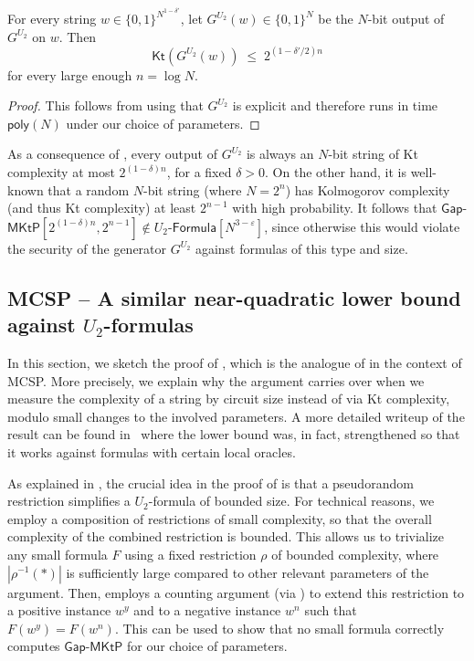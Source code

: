 \documentclass{toc}
\newcommand{\gapmktp}{\mathsf{Gap}$-$\mathsf{MKtP}}
\newcommand{\Kt}{\mathsf{Kt}}
\begin{document}
\begin{proposition}\label{prop:PRG_Kt}
For every string $w \in \{0,1\}^{N^{1 - \delta'}}$, let $G^{U_2}(w) \in \{0,1\}^N$ be the $N$-bit output of $G^{U_2}$ on $w$. Then
$$
\Kt(G^{U_2}(w)) \;\leq\; 2^{(1 - \delta'/2)n}
$$ 
for every large enough $n = \log N$.
\end{proposition}

\begin{proof}
This follows from  using that $G^{U_2}$ is explicit and therefore runs in time $\mathsf{poly}(N)$ under our choice of parameters.
\end{proof}

As a consequence of , every output of $G^{U_2}$ is always an $N$-bit string of Kt complexity at most $2^{(1 - \delta)n}$, for a fixed $\delta > 0$. On the other hand, it is well-known that a random $N$-bit string (where $N = 2^n$) has Kolmogorov complexity (and thus Kt complexity) at least $2^{n - 1}$ with high probability. It follows that $\gapmktp[2^{(1 - \delta)n}, 2^{n - 1}] \notin U_2$-$\mathsf{Formula}[N^{3 - \varepsilon}]$, since otherwise this would violate the security of the generator $G^{U_2}$ against formulas of this type and size. 




\subsection{MCSP -- A similar near-quadratic lower bound against $U_2$-formulas}\label{ss:quadratic_mcsp}

In this section, we sketch the proof of , which is the analogue of  in the context of MCSP. More precisely, we explain why the argument carries over when we measure the complexity of a string by circuit size instead of via Kt complexity, modulo small changes to the involved parameters. A more detailed writeup of the result can be found in~\cite{chen_et_al:LIPIcs:2020:11755} where the lower bound was, in fact, strengthened so that it works against formulas with certain local oracles.

As explained in , the crucial idea in the proof of  is that a pseudorandom restriction simplifies a $U_2$-formula of bounded size. For technical reasons, we employ a composition of restrictions of small complexity, so that the overall complexity of the combined restriction is bounded. This allows us to trivialize any small formula $F$ using a fixed restriction $\rho$ of bounded complexity, where $|\rho^{-1}(*)|$ is sufficiently large compared to other relevant parameters of the argument. Then,  employs a counting argument (via ) to extend this restriction to a positive instance $w^y$ and to a negative instance $w^n$ such that $F(w^y) = F(w^n)$.  This can be used to show that no small formula correctly computes $\gapmktp$ for our choice of parameters.
\end{document}
